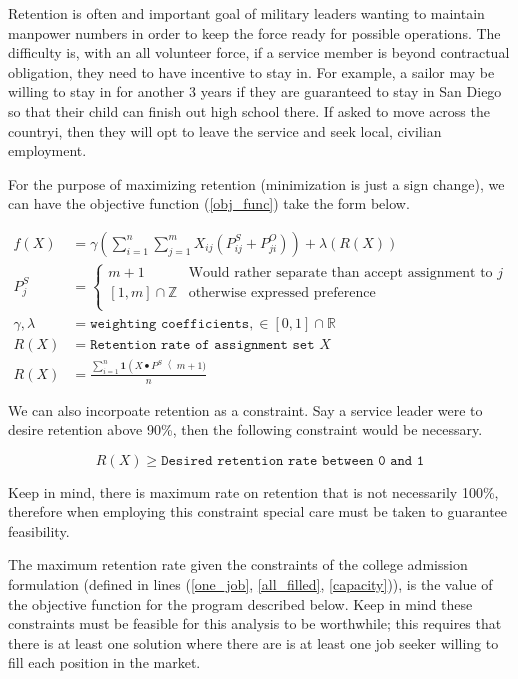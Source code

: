 Retention is often and important goal of military leaders wanting to maintain manpower numbers in order to keep the force ready for possible operations. The difficulty is, with an all volunteer force, if a service member is beyond contractual obligation, they need to have incentive to stay in. For example, a sailor may be willing to stay in for another 3 years if they are guaranteed to stay in San Diego so that their child can finish out high school there. If asked to move across the countryi, then they will opt to leave the service and seek local, civilian employment. 

For the purpose of maximizing retention (minimization is just a sign change), we can have the objective function (\ref{obj_func}) take the form below.

\begin{align*}
f(X) &= \gamma\left(\sum_{i=1}^n \sum_{j=1}^m X_{ij}(P^S_{ij} + P^O_{ji})\right) + \lambda (R(X)) \\
P^S_j &= \begin{cases}
m + 1 &  \text{Would rather separate than accept assignment to } j \\
[1,m] \cap \mathbb{Z}  &  \text{otherwise expressed preference} \\
\end{cases} \\ 
\gamma, \lambda &= \texttt{weighting coefficients}, \in [0,1] \cap \mathbb{R} \\
R(X) &= \texttt{Retention rate of assignment set }X \\
R(X) &= \frac{\sum_{i=1}^n \mathbf{1}\left(X\bullet P^S\right < m+1)}{n}
\end{align*}

We can also incorpoate retention as a constraint. Say a service leader were to desire retention above 90\%, then the following constraint would be necessary. 

\[R(X) \geq \texttt{Desired retention rate between 0 and 1} \]

Keep in mind, there is maximum rate on retention that is not necessarily 100\%, therefore when employing this constraint special care must be taken to guarantee feasibility.  

The maximum retention rate given the constraints of the college admission formulation (defined in lines (\ref{one_job}, \ref{all_filled}, \ref{capacity})), is the value of the objective function for the program described below. Keep in mind these constraints must be feasible for this analysis to be worthwhile; this requires that there is at least one solution where there are is at least one job seeker willing to fill each position in the market.

